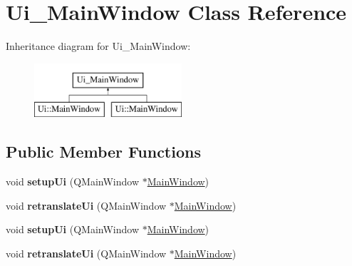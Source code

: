\hypertarget{class_ui___main_window}{\section{\-Ui\-\_\-\-Main\-Window \-Class \-Reference}
\label{class_ui___main_window}
}
\-Inheritance diagram for \-Ui\-\_\-\-Main\-Window\-:\begin{figure}[H]
\begin{center}
\leavevmode
\includegraphics[height=2.000000cm]{class_ui___main_window}
\end{center}
\end{figure}
\subsection*{\-Public \-Member \-Functions}
\begin{DoxyCompactItemize}
\item 
\hypertarget{class_ui___main_window_acf4a0872c4c77d8f43a2ec66ed849b58}{void {\bfseries setup\-Ui} (\-Q\-Main\-Window $\ast$\hyperlink{class_main_window}{\-Main\-Window})}\label{class_ui___main_window_acf4a0872c4c77d8f43a2ec66ed849b58}

\item 
\hypertarget{class_ui___main_window_a097dd160c3534a204904cb374412c618}{void {\bfseries retranslate\-Ui} (\-Q\-Main\-Window $\ast$\hyperlink{class_main_window}{\-Main\-Window})}\label{class_ui___main_window_a097dd160c3534a204904cb374412c618}

\item 
\hypertarget{class_ui___main_window_acf4a0872c4c77d8f43a2ec66ed849b58}{void {\bfseries setup\-Ui} (\-Q\-Main\-Window $\ast$\hyperlink{class_main_window}{\-Main\-Window})}\label{class_ui___main_window_acf4a0872c4c77d8f43a2ec66ed849b58}

\item 
\hypertarget{class_ui___main_window_a097dd160c3534a204904cb374412c618}{void {\bfseries retranslate\-Ui} (\-Q\-Main\-Window $\ast$\hyperlink{class_main_window}{\-Main\-Window})}\label{class_ui___main_window_a097dd160c3534a204904cb374412c618}

\end{DoxyCompactItemize}
